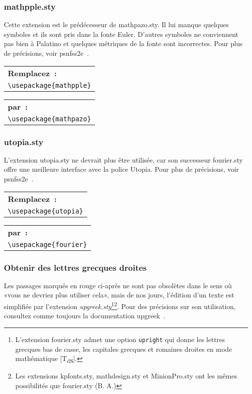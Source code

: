 \documentclass[fontsize=11pt, paper=a4, pagesize, captions=tableheading, numbers=enddot, toc=graduated, footnotes=multiple]{scrartcl}%
\makeatletter
\newcommand{\Doku}[1]{\textsf{#1}\xspace}
\newcommand{\Paket}[1]{\textsf{#1.sty}\xspace}
\newcommand{\PakeH}[1]{#1.sty\xspace}
\newenvironment{Ers}[1][\linewidth]{%
  \par\bigskip\noindent\marginline{\textcolor{gruen}{\boldmath $\triangleright$}}\begin{tabular}[t]{@{}p{0.5\textwidth}@{}}\textcolor{rot}{\textbf{\textsf{Remplacez~:}}%
}\\[2pt] \rahmenpr[#1]}%
{\endrahmenpr\end{tabular}}
\newenvironment{Dur}[1][0.5\textwidth]{%
\noindent\begin{tabular}[t]{@{}p{0.5\textwidth - 0.5em}@{}}\textcolor{gruen}{\textbf{\textsf{par~:}}}\\[2pt]\rahmenpg[#1]}%
{\endrahmenpg\end{tabular}\smallskip\noindent}
\newcommand{\NDT}{[T\textsubscript{dS}].} %
\newcommand{\PakeT}[1]{\textsf{\textsl{#1.sty}}}%
\makeatother
\begin{document}
\subsubsection{\Paket{mathpple}}
\label{sec:paketmathpple}

Cette extension est le prédécesseur de \Paket{mathpazo}. Il lui manque quelques symboles et ils sont pris dans la fonte Euler. D'autres symboles ne conviennent pas bien à Palatino et quelques métriques de la fonte sont incorrectes. Pour plus de précisions, voir \Doku{psnfss2e}~\cite{psnfss-04}.

\begin{Ers}
  \verb+\usepackage{mathpple}+
\end{Ers}
\begin{Dur}
  \verb+\usepackage{mathpazo}+
\end{Dur}

\subsubsection{\PakeH{utopia}}
\label{sec:paketutopia}

L’extension \Paket{utopia} ne devrait plus être utilisée, car son successeur \Paket{fourier} offre une meilleure interface avec la police Utopia. Pour plus de précisions, voir \Doku{psnfss2e}~\cite{psnfss-04}.

\begin{Ers}
  \verb+\usepackage{utopia}+
\end{Ers}
\begin{Dur}
  \verb+\usepackage{fourier}+
\end{Dur}

\subsubsection{Obtenir des lettres grecques droites}
\label{sec:aufr-griech-buchst}

Les passages marqués en rouge ci-après ne sont pas obsolètes dans le sens où «vous ne devriez plus utiliser cela», mais de nos jours,
l'édition d'un texte est simplifiée par l'extension \PakeT{upgreek}\footnote{L'extension \Paket{fourier} admet une option \texttt{upright} qui donne les lettres grecques bas de casse, les capitales grecques et romaines droites en mode mathématique \NDT}\footnote{Les extensions \Paket{kpfonts}, \Paket{mathdesign} et \Paket{MinionPro} ont les mêmes possibilités que \Paket{fourier} (B. A.)}. Pour des précisions sur son utilisation, consultez comme toujours la documentation \Doku{upgreek}~\cite{upgreek-03}.
\end{document}
